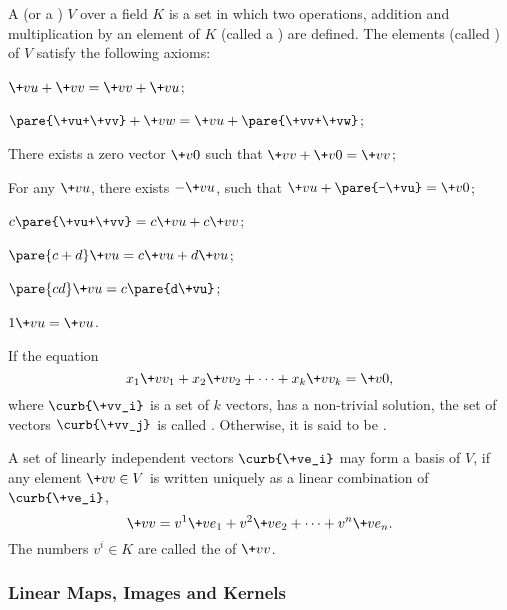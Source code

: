 \documentclass[hidelinks]{article}
\begin{document}
A  (or a ) $V$ over a field $K$ is a set in which two operations, addition and multiplication by an element of $K$ (called a ) are defined. The elements (called ) of $V$ satisfy the following axioms:
\begin{cenum}
    \item $\+vu+\+vv = \+vv+\+vu$;
    \item $\pare{\+vu+\+vv} + \+vw = \+vu + \pare{\+vv+\+vw}$;
    \item There exists a zero vector $\+v0$ such that $\+vv+\+v0 = \+vv$;
    \item For any $\+vu$, there exists $-\+vu$, such that $\+vu+\pare{-\+vu} = \+v0$;
    \item $c\pare{\+vu+\+vv} = c\+vu+c\+vv$;
    \item $\pare{c+d}\+vu = c\+vu+d\+vu$;
    \item $\pare{cd}\+vu = c\pare{d\+vu}$;
    \item $1\+vu = \+vu$.
\end{cenum}
If the equation
\[ x_1 \+vv_1 + x_2 \+vv_2 + \cdots + x_k \+vv_k = \+v0, \]
where $\curb{\+vv_i}$ is a set of $k$ vectors, has a non-trivial solution, the set of vectors $\curb{\+vv_j}$ is called . Otherwise, it is said to be .
\par
A set of linearly independent vectors $\curb{\+ve_i}$ may form a basis of $V$, if any element $\+vv\in V$ is written uniquely as a linear combination of $\curb{\+ve_i}$,
\[ \+vv = v^1 \+ve_1 + v^2 \+ve_2 + \cdots + v^n \+ve_n. \]
The numbers $v^i\in K$ are called the  of $\+vv$.


\subsubsection{Linear Maps, Images and Kernels} %
\label{ssub:linear_maps_images_and_kernels}
\end{document}
